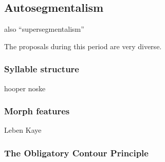 \subsection{Autosegmentalism}

also ``supersegmentalism''

The proposals during this period are very diverse. 

\subsubsection{Syllable structure}

hooper
noske

\subsubsection{Morph features}

Leben
Kaye


\subsubsection{The Obligatory Contour Principle}
